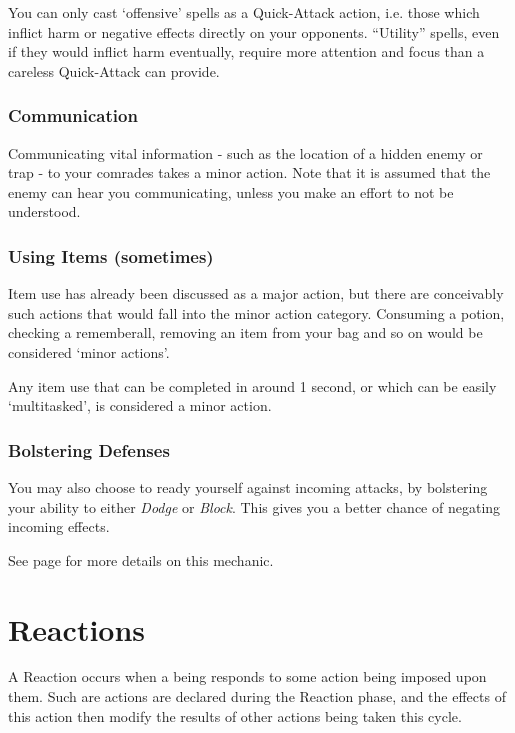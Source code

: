 You can only cast `offensive' spells as a Quick-Attack action, i.e. those which inflict harm or negative effects directly on your opponents. ``Utility'' spells, even if they would inflict harm eventually, require more attention and focus than a careless Quick-Attack can provide. 
 
\subsubsection{Communication}

Communicating vital information - such as the location of a hidden enemy or trap - to your comrades takes a minor action. Note that it is assumed that the enemy can hear you communicating, unless you make an effort to not be understood. 

\subsubsection{Using Items (sometimes)}

Item use has already been discussed as a major action, but there are conceivably such actions that would fall into the minor action category. Consuming a potion, checking a rememberall, removing an item from your bag and so on would be considered `minor actions'. 

Any item use that can be completed in around 1 second, or which can be easily `multitasked', is considered a minor action. 

\subsubsection{Bolstering Defenses}
 
 You may also choose to ready yourself against incoming attacks, by bolstering your ability to either {\it Dodge} or {\it Block}. This gives you a better chance of negating incoming effects.  

See page \pageref{S:Accuracy} for more details on this mechanic. 

\section{Reactions} \label{S:Reactions}

A Reaction occurs when a being responds to some action being imposed upon them. Such are actions are declared during the Reaction phase, and the effects of this action then modify the results of other actions being taken this cycle. 

